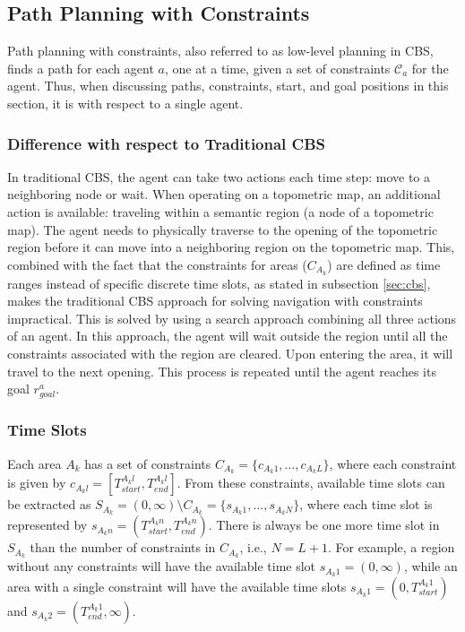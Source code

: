 \documentclass[letterpaper, 10 pt, conference]{ieeeconf}  %
\begin{document}
\subsection{Path Planning with Constraints}\label{sec:pathPlan}
Path planning with constraints, also referred to as low-level planning in CBS, finds a path for each agent $a$, one at a time, given a set of constraints $\mathcal{C}_a$ for the agent. Thus,  when discussing paths, constraints, start, and goal positions in this section, it is with respect to a single agent.

\subsubsection{Difference with respect to Traditional CBS}
In traditional CBS, the agent can take two actions each time step: move to a neighboring node or wait. When operating on a topometric map, an additional action is available: traveling within a semantic region (a node of a topometric map). The agent needs to physically traverse to the opening of the topometric region before it can move into a neighboring region on the topometric map. This, combined with the fact that the constraints for areas ($C_{A_k}$) are defined as time ranges instead of specific discrete time slots, as stated in subsection \ref{sec:cbs}, makes the traditional CBS approach for solving navigation with constraints impractical.
%
This is solved by using a search approach combining all three actions of an agent. In this approach, the agent will wait outside the region until all the constraints associated with the region are cleared. Upon entering the area, it will travel to the next opening. This process is repeated until the agent reaches its goal $r_{goal}^a$.

\subsubsection{Time Slots}
Each area $A_k$ has a set of constraints $C_{A_k} = \{c_{A_{k}1}, \dots, c_{{A_k}L}\}$, where each constraint is given by $c_{A_{k}l} = [T_{start}^{A_{k}l}, T_{end}^{A_{k}l}]$. From these constraints, available time slots can be extracted as $S_{A_k} = (0,\infty)\setminus C_{A_k} = \{s_{A_k1}, \dots, s_{A_kN}\}$, where each time slot is represented by $s_{A_{k}n} = (T_{start}^{A_{k}n}, T_{end}^{A_{k}n})$. There is always be one more time slot in $S_{A_k}$ than the number of constraints in $C_{A_k}$, i.e., $N=L + 1$. For example, a region without any constraints will have the available time slot $s_{A_{k}1} = (0, \infty)$, while an area with a single constraint will have the available time slots $s_{A_{k}1} = (0, T_{start}^{{A_k1}})$ and $s_{A_{k}2} = (T_{end}^{{A_k1}}, \infty)$.
\end{document}
